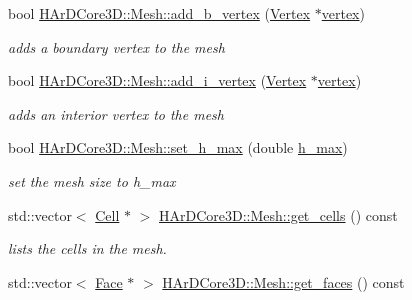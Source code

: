 \begin{DoxyCompactItemize}
bool \hyperlink{group__Mesh_ga6495493613a7e8453473cce4838b7dc8}{H\+Ar\+D\+Core3\+D\+::\+Mesh\+::add\+\_\+b\+\_\+vertex} (\hyperlink{classHArDCore3D_1_1Vertex}{Vertex} $\ast$\hyperlink{classHArDCore3D_1_1Mesh_ad099224c697c05a57fad6a47fdcd9e76}{vertex})
\begin{DoxyCompactList}\small\item\em adds a boundary vertex to the mesh \end{DoxyCompactList}\item 
\mbox{\label{group__Mesh_gac084d96b6ffab6ff330cdd3aaf8dd424}} 
bool \hyperlink{group__Mesh_gac084d96b6ffab6ff330cdd3aaf8dd424}{H\+Ar\+D\+Core3\+D\+::\+Mesh\+::add\+\_\+i\+\_\+vertex} (\hyperlink{classHArDCore3D_1_1Vertex}{Vertex} $\ast$\hyperlink{classHArDCore3D_1_1Mesh_ad099224c697c05a57fad6a47fdcd9e76}{vertex})
\begin{DoxyCompactList}\small\item\em adds an interior vertex to the mesh \end{DoxyCompactList}\item 
\mbox{\label{group__Mesh_gafdbe174b87d591e573dd1953650744ec}} 
bool \hyperlink{group__Mesh_gafdbe174b87d591e573dd1953650744ec}{H\+Ar\+D\+Core3\+D\+::\+Mesh\+::set\+\_\+h\+\_\+max} (double \hyperlink{group__Mesh_gadb86f1eadf808e15e90881d626b467c0}{h\+\_\+max})
\begin{DoxyCompactList}\small\item\em set the mesh size to h\+\_\+max \end{DoxyCompactList}\item 
\mbox{\label{group__Mesh_gabc945c1f5859943cc2e3f771d35e3b2e}} 
std\+::vector$<$ \hyperlink{classHArDCore3D_1_1Cell}{Cell} $\ast$ $>$ \hyperlink{group__Mesh_gabc945c1f5859943cc2e3f771d35e3b2e}{H\+Ar\+D\+Core3\+D\+::\+Mesh\+::get\+\_\+cells} () const
\begin{DoxyCompactList}\small\item\em lists the cells in the mesh. \end{DoxyCompactList}\item 
\mbox{\label{group__Mesh_gab61b9310613e48727c099a7162b79511}} 
std\+::vector$<$ \hyperlink{classHArDCore3D_1_1Face}{Face} $\ast$ $>$ \hyperlink{group__Mesh_gab61b9310613e48727c099a7162b79511}{H\+Ar\+D\+Core3\+D\+::\+Mesh\+::get\+\_\+faces} () const

\end{DoxyCompactItemize}
